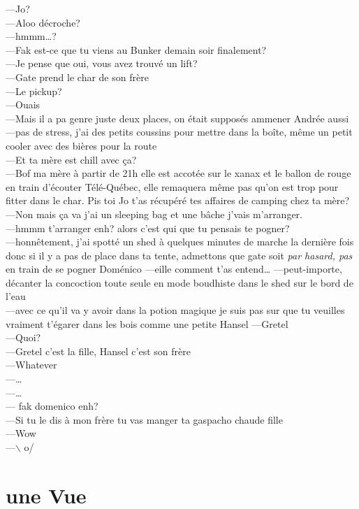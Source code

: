 \documentclass{article}
\begin{document}
---Jo?\\
---Aloo décroche?\\
---hmmm\ldots?\\
---Fak est-ce que tu viens au Bunker demain soir finalement?\\
---Je pense que oui, vous avez trouvé un lift?\\
---Gate prend le char de son frère\\
---Le pickup?\\
---Ouais\\
---Mais il a pa genre juste deux places, on était supposés ammener
Andrée aussi\\
---pas de stress, j'ai des petits coussins pour mettre dans la boîte, même
un petit cooler avec des bières pour la route\\
---Et ta mère est chill avec ça?\\
---Bof ma mère à partir de 21h elle est accotée sur le xanax et le ballon de
  rouge en train d'écouter Télé-Québec, elle remaquera même pas qu'on est
trop pour fitter dans le char. Pis toi Jo t'as récupéré tes affaires de camping
chez ta mère?\\
---Non mais ça va j'ai un sleeping bag et une bâche j'vais m'arranger.\\
---hmmm t'arranger enh? alors c'est qui que tu pensais te pogner?\\
---honnêtement, j'ai spotté un shed à quelques minutes de marche
la dernière fois donc si il y a pas de place dans ta tente,
admettons que gate soit \textit{par hasard, pas} en train
de se pogner Doménico
---eille comment t'as entend\ldots
---peut-importe,  décanter la concoction toute seule en mode boudhiste dans le shed sur le bord de l'eau\\
---avec ce qu'il va y avoir dans la potion magique je suis pas sur
que tu veuilles vraiment t'égarer dans les bois comme une petite
Hansel
---Gretel\\
---Quoi?\\
---Gretel c'est la fille, Hansel c'est son frère\\
---Whatever\\
---\ldots\\
---\ldots\\
--- fak domenico enh?\\
---Si tu le dis à mon frère tu vas manger ta gaspacho chaude fille\\
---Wow\\
---$\backslash$  o/
\clearpage


\section*{une Vue}
\end{document}
